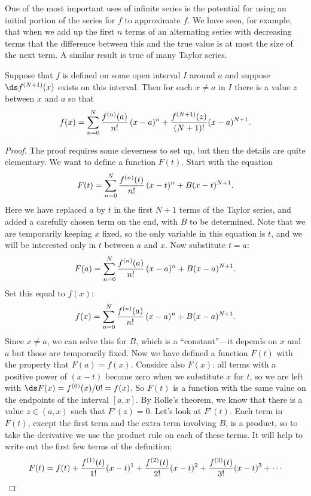 
\nobreak
One of the most important uses of infinite series is the potential for
using an initial portion of the series for $f$ to approximate $f$. We
have seen, for example, that when we add up the first $n$ terms of an
alternating series with decreasing terms that the difference between
this and the true value is at most the size of the next term. A
similar result is true of many Taylor series.

\begin{theorem} Suppose that $f$ is defined on some open interval $I$ around $a$ and
suppose $\ds f^{(N+1)}(x)$ exists on this interval. Then
for each $x\not=a$ in $I$ there is a value $z$ between
$x$ and $a$ so that
$$ 
  f(x) = \sum_{n=0}^N {f^{(n)}(a)\over n!}\,(x-a)^n + 
  {f^{(N+1)}(z)\over (N+1)!}(x-a)^{N+1}. 
$$ 
\end{theorem}
\begin{proof}
The proof requires some cleverness to set up, but then the details are
quite elementary. We want to define a function $F(t)$. 
Start with the equation
$$F(t)=\sum_{n=0}^N{f^{(n)}(t)\over n!}\,(x-t)^n + B(x-t)^{N+1}.$$
Here we have replaced $a$ by $t$ in the first $N+1$ terms of the
Taylor series, and added a carefully chosen term on the end, with $B$
to be determined. Note that
we are temporarily keeping $x$ fixed, so the only variable in this
equation is $t$, and we will be interested
only in $t$ between $a$ and $x$. Now substitute $t=a$:
$$F(a)=\sum_{n=0}^N{f^{(n)}(a)\over n!}\,(x-a)^n + B(x-a)^{N+1}.$$
Set this equal to $f(x)$:
$$f(x)=\sum_{n=0}^N{f^{(n)}(a)\over n!}\,(x-a)^n + B(x-a)^{N+1}.$$
Since $x\not=a$, we can solve this for $B$, which is a
``constant''---it depends on $x$ and $a$ but those are temporarily 
fixed.  Now we
have defined a function $F(t)$ with the property that
$F(a)=f(x)$. Consider also $F(x)$: all terms with a positive power of
$(x-t)$ become zero when we substitute $x$ for $t$, so we are left
with $\ds F(x)=f^{(0)}(x)/0!=f(x)$. So $F(t)$ is a function with the same
value on the endpoints of the interval $[a,x]$. 
By Rolle's theorem, we
know that there is a value $z\in(a,x)$ such that $F'(z)=0$. Let's look
at $F'(t)$. Each term in $F(t)$, except the first term and the extra
term involving $B$, is a product, so to take the derivative we use the
product rule on each of these terms. It will help to write out the
first few terms of the definition:
\begin{align*}
  F(t)=f(t)&+{f^{(1)}(t)\over 1!}(x-t)^1+{f^{(2)}(t)\over 2!}(x-t)^2+
  {f^{(3)}(t)\over 3!}(x-t)^3+\cdots \\

\end{align*}
\end{proof}
